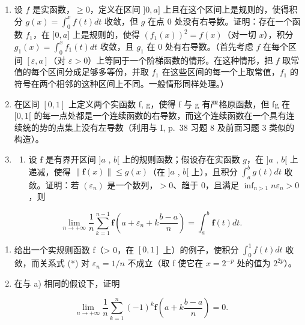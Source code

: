 \begin{enumerate}
\def\labelenumi{\arabic{enumi})}
\setcounter{enumi}{2}
\item
  设 \(f\) 是实函数，\(\geqslant 0\)，定义在区间 \(]0, a]\) 上且在这个区间上是规则的，使得积分 \(g(x) = \int_0^x f(t)dt\) 收敛，但 \(g\) 在点 0 处没有右导数。证明：存在一个函数 \(f_1\)，在 \(]0, a]\) 上是规则的，使得 \((f_1(x))^2 = f(x)\)（对一切 \(x\)），积分 \(g_1(x) = \int_0^x f_1(t)dt\) 收敛，且 \(g_1\) 在 0 处有右导数。（首先考虑 \(f\) 在每个区间 \([\varepsilon, a]\)（对 \(\varepsilon > 0\)）上等同于一个阶梯函数的情形。在这种情形，把 \(f\) 取常值的每个区间分成足够多等份，并取 \(f_1\) 在这些区间的每一个上取常值，\(f_1\) 的符号在两个相邻的这种区间上不同。一般情形同样处理。）
\item
  在区间 \([0,1]\) 上定义两个实函数 f, g，使得 f 与 g 有严格原函数，但 fg 在 \([0,1[\) 的每一点处都是一个连续函数的右导数，而这个连续函数在一个具有连续统的势的点集上没有左导数（利用与 I, p.~38 习题 8 及前面习题 3 类似的构造）。
\item
  \begin{enumerate}
  \def\labelenumii{\alph{enumii})}
  \tightlist
  \item
    设 \(\mathbf{f}\) 是有界开区间 \(]a\) , \(b[\) 上的规则函数；假设存在实函数 \(g\)，在 \(]a\) , \(b[\) 上递减，使得 \(\| \mathbf{f}(x) \| \leqslant g(x)\)（在 \(]a\) , \(b[\) 上），且积分 \(\int_{a}^{b} g(t) dt\) 收敛。证明：若 \((\varepsilon_n)\) 是一个数列，\(>0\)、趋于 0，且满足 \(\inf_{n > 1} n \varepsilon_n > 0\)，则
  \end{enumerate}
\end{enumerate}

\[
\lim _ {n \rightarrow + \infty} \frac {1}{n} \sum_ {k = 1} ^ {n - 1} \mathbf {f} \left(a + \varepsilon_ {n} + k \frac {b - a}{n}\right) = \int_ {a} ^ {b} \mathbf {f} (t) d t.\tag{*}
\]

\begin{enumerate}
\def\labelenumi{\alph{enumi})}
\setcounter{enumi}{1}
\item
  给出一个实规则函数 f（\textgreater{} 0，在 \([0,1]\) 上）的例子，使积分 \(\int_{0}^{1} f(t) dt\) 收敛，而关系式 (*) 对 \(\varepsilon_{n} = 1/n\) 不成立（取 f 使它在 \(x = 2^{-p}\) 处的值为 \(2^{2p}\)）。
\item
  在与 a) 相同的假设下，证明
\end{enumerate}

\[
\lim _ {n \rightarrow + \infty} \frac {1}{n} \sum_ {k = 1} ^ {n} (- 1) ^ {k} \mathbf {f} \left(a + k \frac {b - a}{n}\right) = 0.
\]

